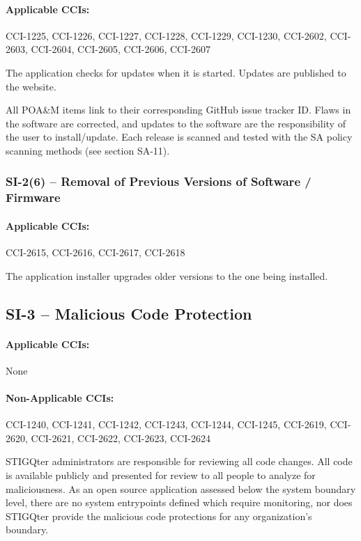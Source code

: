 \documentclass[letterpaper, 10pt, twoside]{article}
\begin{document}
\paragraph{Applicable CCIs:} CCI-1225, CCI-1226, CCI-1227, CCI-1228, CCI-1229, CCI-1230, CCI-2602, CCI-2603, CCI-2604, CCI-2605, CCI-2606, CCI-2607

The application checks for updates when it is started. Updates are published to the website.

All POA\&M items link to their corresponding GitHub issue tracker ID. Flaws in the software are corrected, and updates to the software are the responsibility of the user to install/update. Each release is scanned and tested with the SA policy scanning methods (see section SA-11).

\subsubsection{SI-2(6) -- Removal of Previous Versions of Software / Firmware}

\paragraph{Applicable CCIs:} CCI-2615, CCI-2616, CCI-2617, CCI-2618

The application installer upgrades older versions to the one being installed.

\subsection{SI-3 -- Malicious Code Protection}

\paragraph{Applicable CCIs:} None

\paragraph{Non-Applicable CCIs:} CCI-1240, CCI-1241, CCI-1242, CCI-1243, CCI-1244, CCI-1245, CCI-2619, CCI-2620, CCI-2621, CCI-2622, CCI-2623, CCI-2624

STIGQter administrators are responsible for reviewing all code changes. All code is available publicly and presented for review to all people to analyze for maliciousness. As an open source application assessed below the system boundary level, there are no system entrypoints defined which require monitoring, nor does STIGQter provide the malicious code protections for any organization's boundary.
\end{document}
